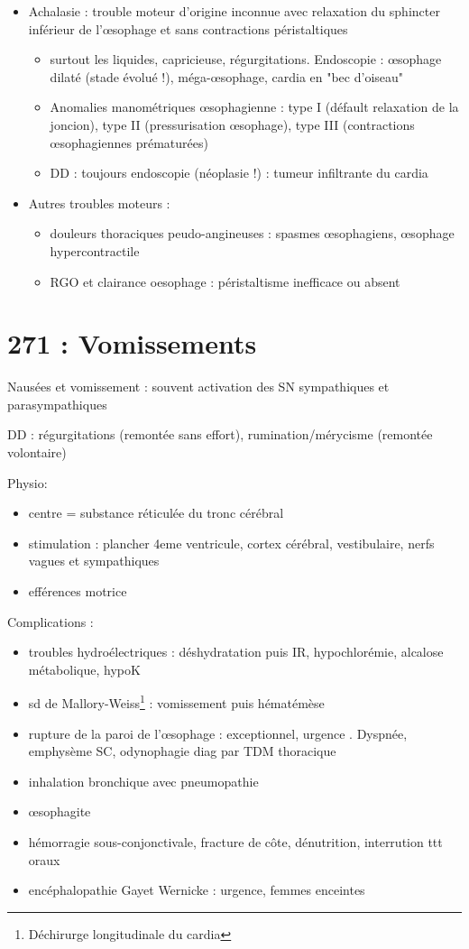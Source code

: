 \documentclass[11pt]{article}
\begin{document}
\begin{itemize}
\item Achalasie : trouble moteur d'origine inconnue avec relaxation du sphincter
inférieur de l'\oe{}sophage et sans contractions péristaltiques
\begin{itemize}
\item surtout les liquides, capricieuse, régurgitations. Endoscopie : \oe{}sophage
dilaté (stade évolué !), méga-\oe{}sophage, cardia en "bec d'oiseau"
\item Anomalies manométriques \oe{}sophagienne : type I (défault relaxation de la
joncion), type II (pressurisation \oe{}sophage), type III (contractions
\oe{}sophagiennes prématurées)
\item DD : toujours endoscopie (néoplasie !) : tumeur infiltrante du cardia
\end{itemize}
\item Autres troubles moteurs : 
\begin{itemize}
\item douleurs thoraciques peudo-angineuses : spasmes \oe{}sophagiens, \oe{}sophage
hypercontractile
\item RGO et clairance oesophage \dec : péristaltisme inefficace ou absent
\end{itemize}
\end{itemize}

\section{271 : Vomissements}
\label{sec:org322168c}
Nausées et vomissement : souvent activation des SN sympathiques et
parasympathiques

DD : régurgitations (remontée sans effort), rumination/mérycisme (remontée
volontaire)

Physio: 
\begin{itemize}
\item centre = substance réticulée du tronc cérébral
\item stimulation : plancher 4eme ventricule, cortex cérébral, vestibulaire, nerfs
vagues et sympathiques
\item efférences motrice
\end{itemize}

Complications :
\begin{itemize}
\item troubles hydroélectriques : déshydratation puis IR, hypochlorémie, alcalose
métabolique, hypoK
\item sd de Mallory-Weiss\footnote{Déchirurge longitudinale du cardia} : vomissement puis hématémèse
\item rupture de la paroi de l'\oe{}sophage : exceptionnel, urgence . Dyspnée,
emphysème SC, odynophagie \thus diag par TDM thoracique
\item inhalation bronchique avec pneumopathie
\item \oe{}sophagite
\item hémorragie sous-conjonctivale, fracture de côte, dénutrition, interrution ttt
oraux
\item encéphalopathie Gayet Wernicke : urgence, femmes enceintes
\end{itemize}
\end{document}
